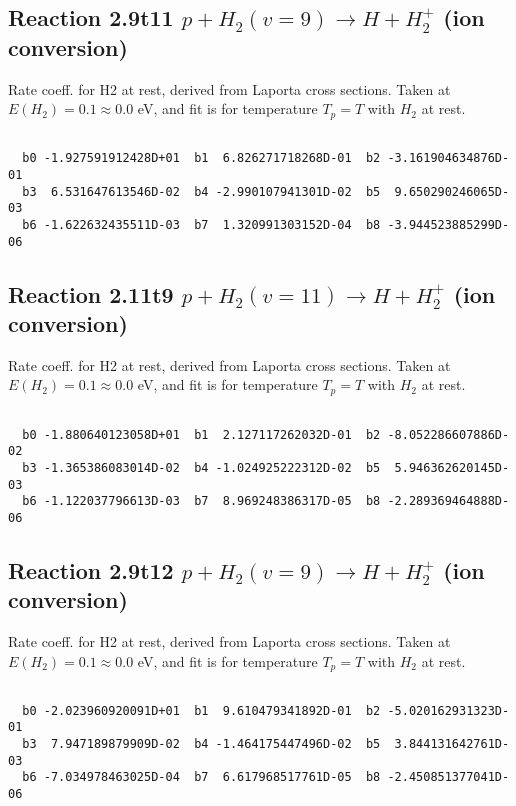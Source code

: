 \documentclass[12pt,dvipdfmx]{article}
\begin{document}
\newpage
\subsection{
Reaction 2.9t11
$ p + H_2(v=9) \rightarrow H + H_2^+$ (ion conversion)
}
Rate coeff. for H2 at rest, derived from Laporta cross sections.
Taken at $E(H_2) = 0.1 \approx 0.0$ eV,  and fit is for temperature $T_p=T$ with $H_2$ at rest.

\begin{small}\begin{verbatim}

  b0 -1.927591912428D+01  b1  6.826271718268D-01  b2 -3.161904634876D-01
  b3  6.531647613546D-02  b4 -2.990107941301D-02  b5  9.650290246065D-03
  b6 -1.622632435511D-03  b7  1.320991303152D-04  b8 -3.944523885299D-06

\end{verbatim}\end{small}

\newpage
\subsection{
Reaction 2.11t9
$ p + H_2(v=11) \rightarrow H + H_2^+$ (ion conversion)
}
Rate coeff. for H2 at rest, derived from Laporta cross sections.
Taken at $E(H_2) = 0.1 \approx 0.0$ eV,  and fit is for temperature $T_p=T$ with $H_2$ at rest.

\begin{small}\begin{verbatim}

  b0 -1.880640123058D+01  b1  2.127117262032D-01  b2 -8.052286607886D-02
  b3 -1.365386083014D-02  b4 -1.024925222312D-02  b5  5.946362620145D-03
  b6 -1.122037796613D-03  b7  8.969248386317D-05  b8 -2.289369464888D-06

\end{verbatim}\end{small}

\newpage
\subsection{
Reaction 2.9t12
$ p + H_2(v=9) \rightarrow H + H_2^+$ (ion conversion)
}
Rate coeff. for H2 at rest, derived from Laporta cross sections.
Taken at $E(H_2) = 0.1 \approx 0.0$ eV,  and fit is for temperature $T_p=T$ with $H_2$ at rest.

\begin{small}\begin{verbatim}

  b0 -2.023960920091D+01  b1  9.610479341892D-01  b2 -5.020162931323D-01
  b3  7.947189879909D-02  b4 -1.464175447496D-02  b5  3.844131642761D-03
  b6 -7.034978463025D-04  b7  6.617968517761D-05  b8 -2.450851377041D-06

\end{verbatim}\end{small}
\end{document}

